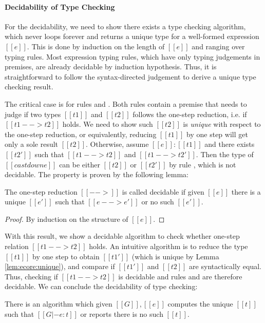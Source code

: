 \paragraph{Decidability of Type Checking}
For the decidability, we need to show there exists a type checking algorithm,
which never loops forever and returns a unique type for a well-formed
expression $[[e]]$. This is done by induction on the length of $[[e]]$ and
ranging over typing rules. Most expression typing rules, which have only typing
judgements in premises, are already decidable by induction hypothesis. Thus, it
is straightforward to follow the syntax-directed judgement to derive a unique
type checking result.

The critical case is for rules  and .
Both rules contain a premise that needs to judge if two types $[[t1]]$ and
$[[t2]]$ follows the one-step reduction, i.e. if $[[t1 --> t2]]$ holds. We need
to show such $[[t2]]$ is \emph{unique} with respect to the one-step reduction,
or equivalently, reducing $[[t1]]$ by one step will get only a sole result
$[[t2]]$. Otherwise, assume $[[e]]:[[t1]]$ and there exists $[[t2']]$ such that
$[[t1 --> t2]]$ and $[[t1 --> t2']]$. Then the type of $[[castdown e]]$ can be
either $[[t2]]$ or $[[t2']]$ by rule , which is not
decidable. The property is proven by the following lemma:

\begin{lem}\label{lem:ecore:unique}
	The one-step reduction $[[-->]]$ is called decidable if 
given $[[e]]$ there is a unique $[[e']]$ such that $[[e --> e']]$ or no such $[[e']]$.
\end{lem}

\begin{proof}
	By induction on the structure of $[[e]]$.
\end{proof}

With this result, we show a decidable algorithm to check whether one-step
relation $[[t1 --> t2]]$ holds. An intuitive algorithm is to reduce the type
$[[t1]]$ by one step to obtain $[[t1']]$ (which is unique by Lemma
\ref{lem:ecore:unique}), and compare if $[[t1']]$ and $[[t2]]$ are
syntactically equal. Thus, checking if $[[t1 --> t2]]$ is decidable and rules
 and  are therefore decidable. We can
conclude the decidability of type checking:

\begin{thm}\label{lem:ecore:decide}
	There is an algorithm which given $[[G]], [[e]]$ computes the unique
$[[t]]$ such that $[[G |- e:t]]$ or reports there is no such $[[t]]$.
\end{thm}

